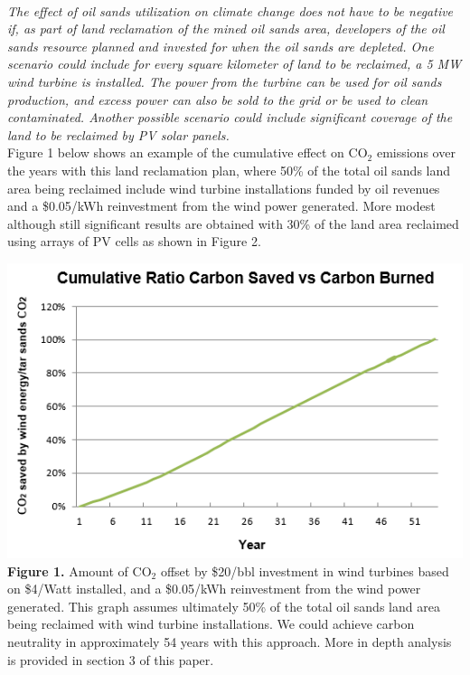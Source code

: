 \documentclass[11pt]{article}
\begin{document}
 \\

\emph{The effect of oil sands utilization on climate change does not have to be negative if, as part of land reclamation of the mined oil sands area, developers of the oil sands resource planned and invested for when the oil sands are depleted. One scenario could include for every square kilometer of land to be reclaimed, a 5 MW wind turbine is installed. The power from the turbine can be used for oil sands production, and excess power can also be sold to the grid or be used to clean contaminated. Another possible scenario could include significant coverage of the land to be reclaimed by PV solar panels. } \\
  
Figure 1 below shows an example of the cumulative effect on CO$_2$ emissions over the years with this land reclamation plan, where 50\% of the total oil sands land area being reclaimed include wind turbine installations funded by oil revenues and a \$0.05/kWh reinvestment from the wind power generated. More modest although still significant results are obtained with 30\% of the land area reclaimed using arrays of PV cells as shown in Figure 2. \\

\begin{center}
\includegraphics{g1.png} \\
{\bf Figure 1.} Amount of CO$_2$ offset by \$20/bbl investment in wind turbines based on \$4/Watt installed, and a \$0.05/kWh reinvestment from the wind power generated. This graph assumes ultimately 50\% of the total oil sands land area being reclaimed with wind turbine installations. We could achieve carbon neutrality in approximately 54 years with this approach. More in depth analysis is provided in section 3 of this paper.
\end{center}
\end{document}
